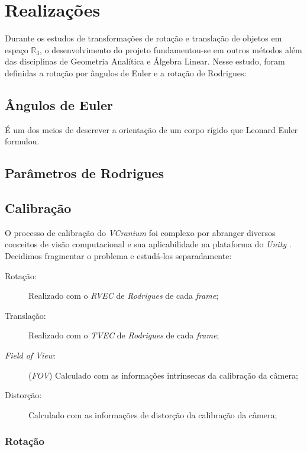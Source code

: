 \chapter{Realizações}\label{chp:realizacoes}

Durante os estudos de transformações de rotação e translação de objetos em espaço \(\mathbb{R}_3\), o desenvolvimento do projeto fundamentou-se em outros métodos além das disciplinas de Geometria Analítica e Álgebra Linear. Nesse estudo, foram definidas a rotação por ângulos de Euler e a rotação de Rodrigues:

\section{Ângulos de Euler}

É um dos meios de descrever a orientação de um corpo rígido que Leonard Euler formulou.

\section{Parâmetros de Rodrigues}




\section{Calibração}\label{chp:calibr}

O processo de calibração do \textit{VCranium} foi complexo por abranger diversos conceitos de visão computacional e sua aplicabilidade na plataforma do \textit{Unity} \cite{UnityOficial}. Decidimos fragmentar o problema e estudá-los separadamente:

\begin{description}
    \item[Rotação:] Realizado com o \textit{RVEC} de \textit{Rodrigues} de cada \textit{frame};
    \item[Translação:] Realizado com o \textit{TVEC} de \textit{Rodrigues} de cada \textit{frame};
    \item[\textit{Field of View}:] (\textit{FOV}) Calculado com as informações intrínsecas da calibração da câmera;
    \item[Distorção:] Calculado com as informações de distorção da calibração da câmera;
\end{description}

\subsection{Rotação}

